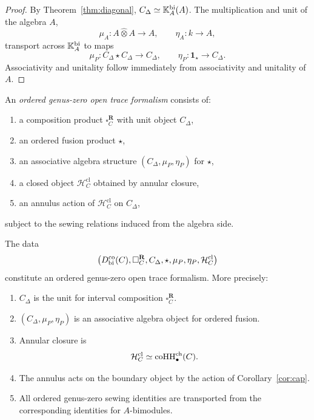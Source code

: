 \begin{proof}
By Theorem~\ref{thm:diagonal}, $C_\Delta\simeq \mathbb{K}_A^{\mathrm{bi}}(A)$. The multiplication and unit
of the algebra $A$,
\[
\mu_A:A\widehat\otimes A\to A,\qquad \eta_A:k\to A,
\]
transport across $\mathbb{K}_A^{\mathrm{bi}}$ to maps
\[
\mu_P:C_\Delta\star C_\Delta\to C_\Delta,\qquad \eta_P:\mathbf 1_\star\to C_\Delta.
\]
Associativity and unitality follow immediately from associativity and unitality of $A$.
\end{proof}

\begin{definition}
An \emph{ordered genus-zero open trace formalism} consists of:
\begin{enumerate}[label=(\roman*)]
\item a composition product $\square_C^{\mathbf R}$ with unit object $C_\Delta$,
\item an ordered fusion product $\star$,
\item an associative algebra structure $(C_\Delta,\mu_P,\eta_P)$ for $\star$,
\item a closed object $\mathcal H_C^{\mathrm{cl}}$ obtained by annular closure,
\item an annulus action of $\mathcal H_C^{\mathrm{cl}}$ on $C_\Delta$,
\end{enumerate}
subject to the sewing relations induced from the algebra side.
\end{definition}

\begin{theorem}
\ClaimStatusProvedHere
\label{thm:ordered-open}
The data
\[
\bigl(D^{\mathrm{co}}_{\mathrm{bi}}(C),\square_C^{\mathbf R},C_\Delta,\star,\mu_P,\eta_P,\mathcal H_C^{\mathrm{cl}}\bigr)
\]
constitute an ordered genus-zero open trace formalism. More precisely:
\begin{enumerate}[label=(\alph*)]
\item $C_\Delta$ is the unit for interval composition $\square_C^{\mathbf R}$.
\item $(C_\Delta,\mu_P,\eta_P)$ is an associative algebra object for ordered fusion.
\item Annular closure is
\[
\mathcal H_C^{\mathrm{cl}}\simeq \operatorname{coHH}^{\mathrm{ch}}_\bullet(C).
\]
\item The annulus acts on the boundary object by the action of
Corollary~\ref{cor:cap}.
\item All ordered genus-zero sewing identities are transported from the corresponding identities for
$A$-bimodules.
\end{enumerate}
\end{theorem}

